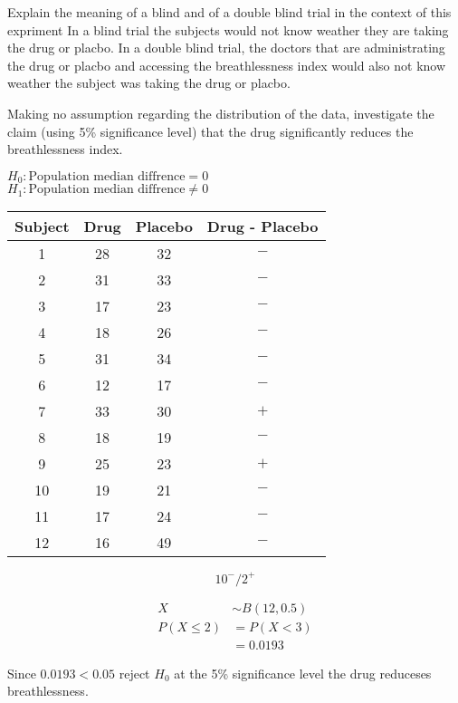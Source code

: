 \begin{example}
        \begin{step}{Explain the meaning of a blind and of a double blind trial in the context of this expriment}
        In a blind trial the subjects would not know weather they are taking the drug or placbo. In a double blind trial, the doctors that are administrating the drug or placbo and accessing the breathlessness index would also not know weather the subject was taking the drug or placbo.
        \end{step}

        \begin{step}{Making no assumption regarding the distribution of the data, investigate the claim (using 5\% significance level) that the drug significantly reduces the breathlessness index.}
        \end{step}
        $H_0: \text{Population median diffrence} = 0$\\
        $H_1: \text{Population median diffrence} \ne 0$

        \begin{center}
        \begin{tabular}{c|c|c|c}
        Subject & Drug & Placebo & Drug - Placebo \\
        \hline
        1  & 28 & 32 & $-$ \\
        2  & 31 & 33 & $-$ \\
        3  & 17 & 23 & $-$ \\
        4  & 18 & 26 & $-$ \\
        5  & 31 & 34 & $-$ \\
        6  & 12 & 17 & $-$ \\
        7  & 33 & 30 & $+$ \\
        8  & 18 & 19 & $-$ \\
        9  & 25 & 23 & $+$ \\
        10 & 19 & 21 & $-$ \\
        11 & 17 & 24 & $-$ \\
        12 & 16 & 49 & $-$ \\
        \end{tabular}
        \end{center}

        $$
        10^- / 2^+
        $$

        \begin{align*}
        X &\sim B(12, 0.5) \\
        P(X \leq 2) &= P(X < 3) \\
        &= 0.0193
        \end{align*}
        
        Since $0.0193 < 0.05$ reject $H_0$ at the 5\% significance level the drug reduceses breathlessness.

        \end{example}
    
